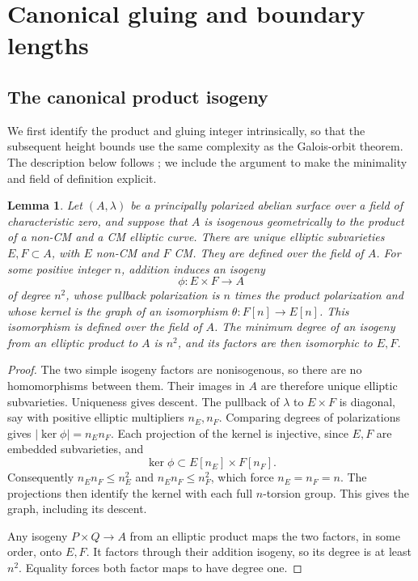 \documentclass[11pt,a4paper]{article}
\numberwithin{equation}{section}
\newtheorem{lemma}[theorem]{Lemma}
\theoremstyle{definition}
\theoremstyle{remark}
\begin{document}
\section{Canonical gluing and boundary lengths}\label{sec:gluing}

\subsection{The canonical product isogeny}

We first identify the product and gluing integer intrinsically, so
that the subsequent height bounds use the same complexity as the
Galois-orbit theorem. The description below follows
\cite[Lemmas~2.1 and~3.2]{DO}; we include the argument to make the
minimality and field of definition explicit.

\begin{lemma}\label{lem:gluing}
Let \((A,\lambda)\) be a principally polarized abelian surface over
a field of characteristic zero, and suppose that \(A\) is isogenous
geometrically to the product of a non-CM and a CM elliptic curve.
There are unique elliptic subvarieties \(E,F\subset A\), with \(E\)
non-CM and \(F\) CM. They are defined over the field of \(A\).
For some positive integer \(n\), addition induces an isogeny
\[
 \phi:E\times F\longrightarrow A
\]
of degree \(n^2\), whose pullback polarization is \(n\) times the
product polarization and whose kernel is the graph of an isomorphism
\(\theta:F[n]\to E[n]\). This isomorphism is defined over the field of
\(A\). The minimum degree of an isogeny from an elliptic product to
\(A\) is \(n^2\), and its factors are then isomorphic to \(E,F\).
\end{lemma}

\begin{proof}
The two simple isogeny factors are nonisogenous, so there are no
homomorphisms between them. Their images in \(A\) are therefore
unique elliptic subvarieties. Uniqueness gives descent.
The pullback of \(\lambda\) to \(E\times F\) is diagonal, say with
positive elliptic multipliers \(n_E,n_F\). Comparing degrees of
polarizations gives \(|\ker\phi|=n_En_F\).
Each projection of the kernel is injective, since \(E,F\) are
embedded subvarieties, and
\[
 \ker\phi\subset E[n_E]\times F[n_F].
 \]
Consequently \(n_En_F\le n_E^2\) and \(n_En_F\le n_F^2\), which force
\(n_E=n_F=n\). The projections then identify the kernel with each
full \(n\)-torsion group. This gives the graph, including its descent.

Any isogeny \(P\times Q\to A\) from an elliptic product maps the two
factors, in some order, onto \(E,F\). It factors through their
addition isogeny, so its degree is at least \(n^2\). Equality forces
both factor maps to have degree one.
\end{proof}
\end{document}
